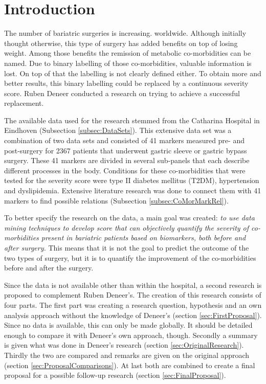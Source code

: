 \documentclass[10pt,a4paper]{report}
\begin{document}
	\section{Introduction}
	\label{sec:Intro}
	
	The number of bariatric surgeries is increasing. worldwide. Although initially thought otherwise, this type of surgery has added benefits on top of losing weight. Among those benefits the remission of metabolic co-morbidities can be named. Due to binary labelling of those co-morbidities, valuable information is lost. On top of that the labelling is not clearly defined either. To obtain more and better results, this binary labelling could be replaced by a continuous severity score. Ruben Deneer conducted a research on trying to achieve a successful replacement.
	
	The available data used for the research stemmed from the Catharina Hospital in Eindhoven (Subsection \ref{subsec:DataSets}). This extensive data set was a combination of two data sets and consisted of 41 markers measured pre- and post-surgery for 2367 patients that underwent gastric sleeve or gastric bypass surgery. These 41 markers are divided in several sub-panels that each describe different processes in the body. Conditions for these co-morbidities that were tested for the severity score were type II diabetes mellitus (T2DM), hypertension and dyslipidemia. Extensive literature research was done to connect them with 41 markers to find possible relations (Subsection \ref{subsec:CoMorMarkRel}).
	
	To better specify the research on the data, a main goal was created: \emph{to use data mining techniques to develop score that can objectively quantify the severity of co-morbidities present in bariatric patients based on biomarkers, both before and after surgery.} \cite{Deneer2017Thesis} This means that it is not the goal to predict the outcome of the two types of surgery, but it is to quantify the improvement of the co-morbidities before and after the surgery.
	
	Since the data is not available other than within the hospital, a second research is proposed to complement Ruben Deneer's. The creation of this research consists of four parts. The first part was creating a research question, hypothesis and an own analysis approach without the knowledge of Deneer's (section \ref{sec:FirstProposal}). Since no data is available, this can only be made globally. It should be detailed enough to compare it with Deneer's own approach, though. Secondly a summary is given what was done in Deneer's research (section \ref{sec:OriginalResearch}). Thirdly the two are compared and remarks are given on the original approach (section \ref{sec:ProposalComparisons}). At last both are combined to create a final proposal for a possible follow-up research (section \ref{sec:FinalProposal}). 
	
\end{document}
